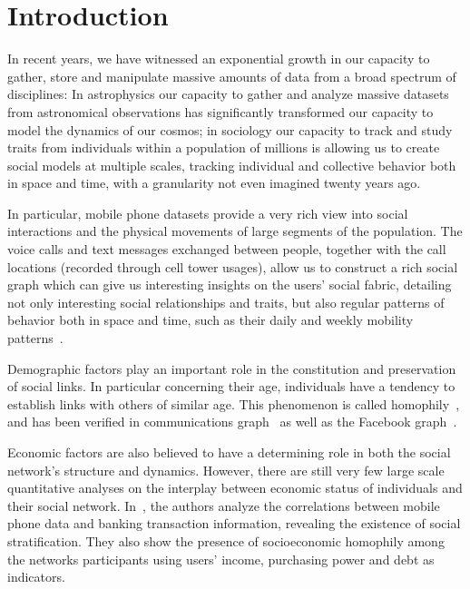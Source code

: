 \section{Introduction}


In recent years, we have witnessed an exponential growth in our capacity to gather, store and manipulate massive amounts of data from a broad spectrum of disciplines: In astrophysics our capacity to gather and analyze massive datasets from astronomical observations has significantly transformed our capacity to model the dynamics of our cosmos; in sociology our capacity to track and study traits from individuals within a population of millions is allowing us to create social models at multiple scales, tracking individual and collective behavior both in space and time, with a granularity not even imagined twenty years ago.


In particular, mobile phone datasets provide a very rich view into social interactions and the physical movements of large segments of the population. The voice calls and text messages exchanged between people, together with the call locations (recorded through cell tower usages), allow us to construct a rich social graph which can give us interesting insights on the users' social fabric, detailing not only interesting social relationships and traits, but also regular patterns of behavior both in space and time, such as their daily and weekly mobility patterns~\cite{gonzalez2008understanding,ponieman2013human,sarraute2015city}.

Demographic factors play an important role in the constitution and preservation of social links. In particular concerning their age, individuals have a tendency to
establish links with others of similar age. This phenomenon is called homophily~\cite{mcpherson2001birds}, and has been verified in communications graph~\cite{blumenstock2010mobile,sarraute2014} as well as the Facebook graph~\cite{ugander2011anatomy}.


Economic factors are also believed to have a determining role in both the social network's structure and dynamics. However, there are still very few large scale quantitative analyses on the interplay between economic status of individuals and their social network. In~\cite{leo2015socioeconomic}, the authors analyze the correlations between mobile phone data and banking transaction information, revealing the existence of social stratification. They also show the presence of socioeconomic homophily among the networks participants using users' income, purchasing power and debt as indicators.


